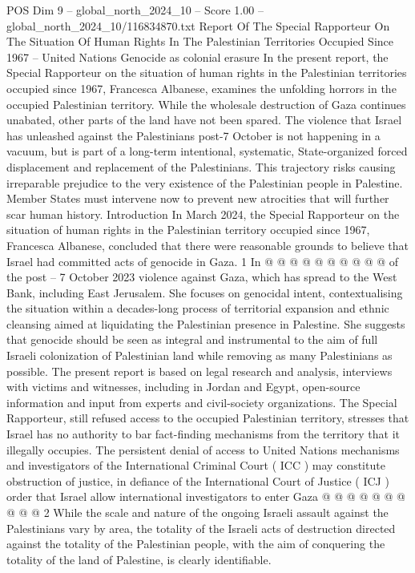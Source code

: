 \begin{textsample}{POS Dim 9 – global\_north\_2024\_10 – Score 1.00 – global\_north\_2024\_10/116834870.txt}  \label{ex:f9_pos_396}
Report Of The Special Rapporteur On The Situation Of Human Rights In The Palestinian Territories Occupied Since 1967 -- United Nations Genocide as colonial erasure In the present report, the Special Rapporteur on the situation of human rights in the Palestinian territories occupied since 1967, Francesca Albanese, examines the unfolding horrors in the occupied Palestinian territory.
While the wholesale destruction of Gaza continues unabated, other parts of the land have not been spared.
The violence that Israel has unleashed against the Palestinians post-7 October is not happening in a vacuum, but is part of a long-term intentional, systematic, State-organized forced displacement and replacement of the Palestinians.
This trajectory risks causing irreparable prejudice to the very existence of the Palestinian people in Palestine.
Member States must intervene now to prevent new atrocities that will further scar human history.
Introduction In March 2024, the Special Rapporteur on the situation of human rights in the Palestinian territory occupied since 1967, Francesca Albanese, concluded that there were reasonable grounds to believe that Israel had committed acts of genocide in Gaza. 1 In @ @ @ @ @ @ @ @ @ @ of the post -- 7 October 2023 violence against Gaza, which has spread to the West Bank, including East Jerusalem.
She focuses on genocidal intent, contextualising the situation within a decades-long process of territorial expansion and ethnic cleansing aimed at liquidating the Palestinian presence in Palestine.
She suggests that genocide should be seen as integral and instrumental to the aim of full Israeli colonization of Palestinian land while removing as many Palestinians as possible.
The present report is based on legal research and analysis, interviews with victims and witnesses, including in Jordan and Egypt, open-source information and input from experts and civil-society organizations.
The Special Rapporteur, still refused access to the occupied Palestinian territory, stresses that Israel has no authority to bar fact-finding mechanisms from the territory that it illegally occupies.
The persistent denial of access to United Nations mechanisms and investigators of the International Criminal Court ( ICC ) may constitute obstruction of justice, in defiance of the International Court of Justice ( ICJ ) order that Israel allow international investigators to enter Gaza @ @ @ @ @ @ @ @ @ @ 2 While the scale and nature of the ongoing Israeli assault against the Palestinians vary by area, the totality of the Israeli acts of destruction directed against the totality of the Palestinian people, with the aim of conquering the totality of the land of Palestine, is clearly identifiable.

\end{textsample}
